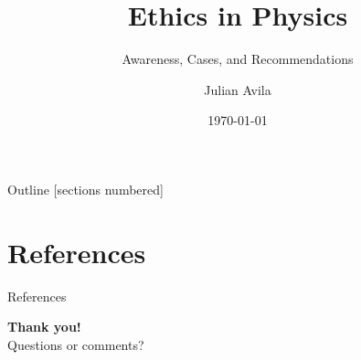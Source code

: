 \documentclass[aspectratio=169,sn-mathphys-num]{beamer}
\title{Ethics in Physics}
\subtitle{Awareness, Cases, and Recommendations}
\author{Julian Avila}
\institute{Universidad Distrital Francisco José de Caldas}
\date{\today}
\begin{document}
\begin{frame}
	\titlepage
\end{frame}

\begin{frame}{Outline}
	[sections numbered]
	\tableofcontents
\end{frame}



\section{References}
\begin{frame}[allowframebreaks]{References}
	\printbibliography
	\nocite{*}
\end{frame}

\begin{frame}[plain]
\centering
\vspace{1cm}
{\Huge \textbf{Thank you!}}\\[1cm]
{\large Questions or comments?}
\end{frame}
\end{document}
